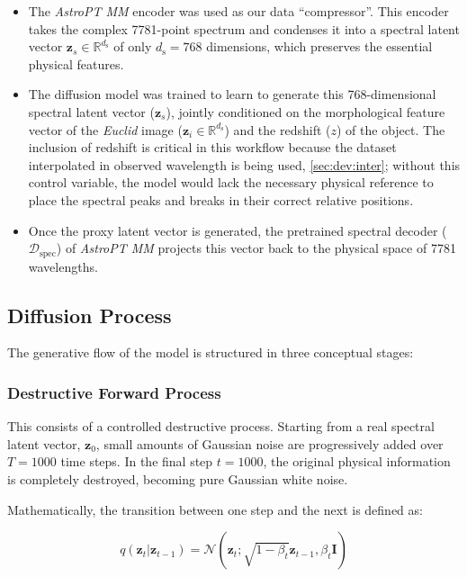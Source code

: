\begin{itemize}
	\item The \textit{AstroPT MM} encoder was used as our data ``compressor''. This encoder takes the complex 7781-point spectrum and condenses it into a spectral latent vector $\mathbf{z}_s \in \mathbb{R}^{d_\text{s}}$ of only $d_\text{s} = 768$ dimensions, which preserves the essential physical features.

	\item The diffusion model was trained to learn to generate this 768-dimensional spectral latent vector ($\mathbf{z}_s$), jointly conditioned on the morphological feature vector of the \textit{Euclid} image ($\mathbf{z}_i \in \mathbb{R}^{d_\text{s}}$) and the redshift ($z$) of the object. The inclusion of redshift is critical in this workflow because the dataset interpolated in observed wavelength is being used, \cref{sec:dev:inter}; without this control variable, the model would lack the necessary physical reference to place the spectral peaks and breaks in their correct relative positions.

	\item Once the proxy latent vector is generated, the pretrained spectral decoder ($\mathcal{D}_{\text{spec}}$) of \textit{AstroPT MM} projects this vector back to the physical space of 7781 wavelengths.
\end{itemize}


\subsection{Diffusion Process}

The generative flow of the model is structured in three conceptual stages:

\subsubsection{Destructive Forward Process}
This consists of a controlled destructive process. Starting from a real spectral latent vector, $\mathbf{z}_0$, small amounts of Gaussian noise are progressively added over $T = 1000$ time steps. In the final step $t = 1000$, the original physical information is completely destroyed, becoming pure Gaussian white noise.

Mathematically, the transition between one step and the next is defined as:

\begin{equation}
q(\mathbf{z}_t | \mathbf{z}_{t-1}) = \mathcal{N}\left(\mathbf{z}_t; \sqrt{1 - \beta_t} \mathbf{z}_{t-1}, \beta_t \mathbf{I}\right)
\label{eq:ap_forward}
\end{equation}

